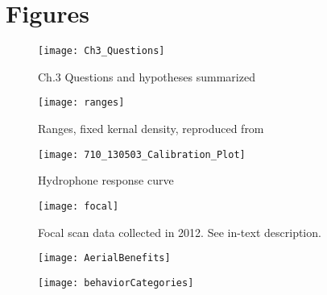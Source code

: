 \documentclass[11pt]{amsart}
\begin{document}

%
%
%
%

\section{Figures}
\clearpage
\begin{figure}
  \centering
    \texttt{[image: Ch3\_Questions]}
  \caption{Ch.3 Questions and hypotheses summarized} %
  \label{fig:questions}
\end{figure}

\begin{figure}
  \centering
    \texttt{[image: ranges]}
  \caption{Ranges, fixed kernal density, reproduced from \citet{randic:2012}} %
  \label{fig:ranges}
\end{figure}

\begin{figure}
  \centering
    \texttt{[image: 710\_130503\_Calibration\_Plot]}
  \caption{Hydrophone response curve} %
  \label{fig:hydrophoneResponse}
\end{figure}

\begin{figure}
  \centering
    \texttt{[image: focal]}
  \caption{Focal scan data collected in 2012. See in-text description.} %
  \label{fig:focalScans}
\end{figure}

\begin{figure}
  \centering
    \texttt{[image: AerialBenefits]}
  \caption{} %
  \label{fig:chronoViz}
\end{figure}

\begin{figure}
  \centering
    \texttt{[image: behaviorCategories]}
  \caption{} %
  \label{fig:behaviors}
\end{figure}


\clearpage




\clearpage




\end{document}
